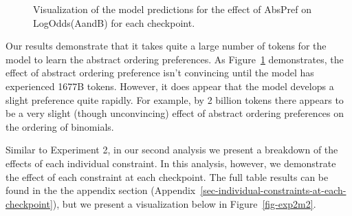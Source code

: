 \documentclass[
  12pt,
  letterpaper,
]{scrreprt}
\begin{document}
\begin{figure}[htbp]

\caption{\label{fig-exp2m1}Visualization of the model predictions for
the effect of AbsPref on LogOdds(AandB) for each checkpoint.}


\end{figure}%

Our results demonstrate that it takes quite a large number of tokens for
the model to learn the abstract ordering preferences. As
Figure~\ref{fig-exp2m1} demonstrates, the effect of abstract ordering
preference isn't convincing until the model has experienced 1677B
tokens. However, it does appear that the model develops a slight
preference quite rapidly. For example, by 2 billion tokens there appears
to be a very slight (though unconvincing) effect of abstract ordering
preferences on the ordering of binomials.

Similar to Experiment 2, in our second analysis we present a breakdown
of the effects of each individual constraint. In this analysis, however,
we demonstrate the effect of each constraint at each checkpoint. The
full table results can be found in the the appendix section
(Appendix~\ref{sec-individual-constraints-at-each-checkpoint}), but we
present a visualization below in Figure~\ref{fig-exp2m2}.
\end{document}
